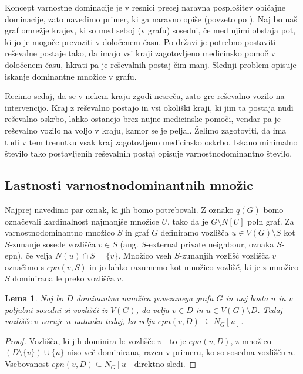 \documentclass[12pt,a4paper,twoside]{article}
\theoremstyle{definition} %
\theoremstyle{plain} %
\newtheorem{lema}[definicija]{Lema}
\numberwithin{equation}{section}  %
\begin{document}
Koncept varnostne dominacije je v resnici precej naravna posplošitev običajne dominacije, zato navedimo primer, ki ga naravno opiše (povzeto po \cite{pavlic2010rimsko}). Naj bo naš graf omrežje krajev, ki so med seboj (v grafu) sosedni, če med njimi obstaja pot, ki jo je mogoče prevoziti v določenem času. Po državi je potrebno postaviti reševalne postaje tako, da imajo vsi kraji zagotovljeno medicinsko pomoč v določenem času, hkrati pa je reševalnih postaj čim manj. Slednji problem opisuje iskanje dominantne množice v grafu.

Recimo sedaj, da se v nekem kraju zgodi nesreča, zato gre reševalno vozilo na intervencijo. Kraj z reševalno postajo in vsi okoliški kraji, ki jim ta postaja nudi reševalno oskrbo, lahko ostanejo brez nujne medicinske pomoči, vendar pa je reševalno vozilo na voljo v kraju, kamor se je peljal. Želimo zagotoviti, da ima tudi v tem trenutku vsak kraj zagotovljeno medicinsko oskrbo. Iskano minimalno število tako postavljenih reševalnih postaj opisuje varnostnodominantno število.

\subsection{Lastnosti varnostnodominantnih množic}
Najprej navedimo par oznak, ki jih bomo potrebovali. Z oznako $q(G)$ bomo označevali kardinalnost najmanjše množice $U$, tako da je $G \setminus N[U]$ poln graf. Za varnostnodominantno množico $S$ in graf $G$ definiramo vozlišča $u \in V(G) \setminus S$ kot $S$-zunanje sosede vozlišča $v \in S$  (ang. $S$-external private neighbour, oznaka $S$-epn), če velja $N(u) \cap S = \{v\}$. Množico vseh $S$-zunanjih vozlišč vozlišča $v$ označimo s \emph{$epn(v, S)$} in jo lahko razumemo kot množico vozlišč, ki je z množico $S$ dominirana le preko vozlišča $v$.

\begin{lema}\label{lemaEPN}
Naj bo $D$ dominantna množica povezanega grafa $G$ in naj bosta $u$ in $v$ poljubni  sosedni si vozlišči iz $V(G)$, da velja $v \in D$ in $u \in V(G) \setminus D$. Tedaj vozlišče $v$ varuje $u$ natanko tedaj, ko velja $epn(v, D)$ $\subseteq N_G[u]$. 
\end{lema}

\begin{proof}
Vozlišča, ki jih dominira le vozlišče $v$---to je $epn(v, D)$, z množico $(D \setminus \{v\}) \cup \{u\}$ niso več dominirana, razen v primeru, ko so sosedna vozlišču $u$. Vsebovanost $epn(v, D) \subseteq N_G[u]$ direktno sledi.
\end{proof}
\end{document}

